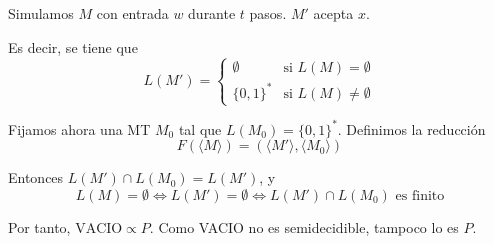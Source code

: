 \begin{ejercicio}
\begin{itemize}
\begin{algorithm}
\begin{algorithmic}
                        \State Simulamos $M$ con entrada $w$ durante $t$ pasos.
                            \State $M'$ acepta $x$.
                        \EndIf
                    \EndFor
                \EndFor
            \end{algorithmic}
        \end{algorithm}

        Es decir, se tiene que $$L(M') = \begin{cases}
            \emptyset &\text{si } L(M) = \emptyset \\
            \{0,1\}^{*} &\text{si } L(M) \neq \emptyset 
        \end{cases}$$

        Fijamos ahora una MT $M_0$ tal que $L(M_0) = \{0,1\}^{*}$. Definimos la reducción
        $$F(\langle M \rangle) = (\langle M' \rangle, \langle M_0 \rangle)$$

        Entonces $L(M') \cap L(M_0) = L(M')$, y 
        $$L(M) = \emptyset \iff L(M') = \emptyset \iff L(M') \cap L(M_0) \text{ es finito}$$

        Por tanto, $\text{VACIO} \propto P$. Como VACIO no es semidecidible, tampoco lo es $P$. 


    \end{itemize}
\end{ejercicio}




